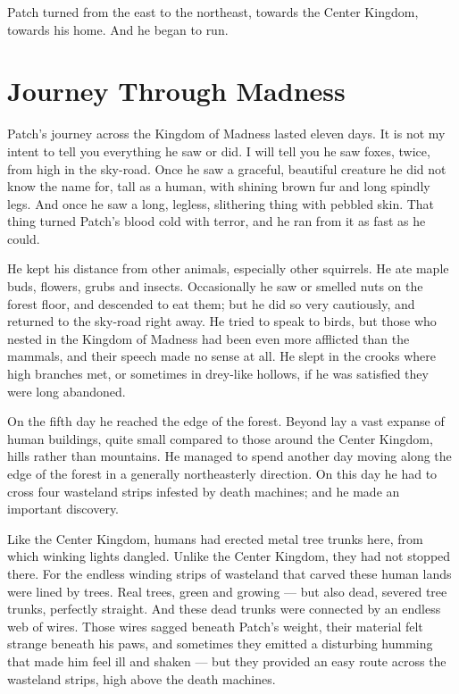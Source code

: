 \documentclass[ebook,oneside,openany,17pt]{memoir}
\newenvironment{tolerant}[1]{%
  \par\tolerance=#1\relax
}{%
  \par
}
\renewcommand{\thechapter}{\Roman{chapter}}
\newcounter{sections}
\newcommand{\sections}[1]{%
  \section*{#1}
  \addtocounter{sections}{1}%
  \pdfbookmark[1]{#1}{section.\thechapter.\thesections}}
\begin{document}
Patch turned from the east to the northeast, towards the Center
Kingdom, towards his home. And he began to run.


\sections{Journey Through Madness}

\begin{tolerant}{500}
Patch’s journey across the Kingdom of Madness last\-ed eleven days. It
is not my intent to tell you everything he saw or did. I will tell you
he saw foxes, twice, from high in the sky-road. Once he saw a
graceful, beautiful creature he did not know the name for, tall as a
human, with shining brown fur and long spindly legs. And once he saw a
long, legless, slithering thing with pebbled skin. That thing turned
Patch’s blood cold with terror, and he ran from it as fast as he
could.
\end{tolerant}

He kept his distance from other animals, especially other
squirrels. He ate maple buds, flowers, grubs and insects. Occasionally
he saw or smelled nuts on the forest floor, and descended to eat them;
but he did so very cautiously, and returned to the sky-road right
away. He tried to speak to birds, but those who nested in the Kingdom
of Madness had been even more afflicted than the mammals, and their
speech made no sense at all. He slept in the crooks where high
branches met, or sometimes in drey-like hollows, if he was satisfied
they were long abandoned.

On the fifth day he reached the edge of the forest. Beyond lay a vast
expanse of human buildings, quite small compared to those around the
Center Kingdom, hills rather than mountains. He managed to spend
another day moving along the edge of the forest in a generally
northeasterly direction. On this day he had to cross four wasteland
strips infested by death machines; and he made an important discovery.

\begin{tolerant}{1000}
Like the Center Kingdom, humans had erected metal tree trunks here,
from which winking lights dangled. Unlike the Center Kingdom, they had
not stopped there. For the endless winding strips of wasteland that
carved these human lands were lined by trees. Real trees, green and
growing — but also dead, severed tree trunks, perfectly straight. And
these dead trunks were connected by an endless web of wires. Those
wires sagged beneath Patch’s weight, their material felt strange
beneath his paws, and sometimes they emitted a disturbing humming that
made him feel ill and shaken — but they provided an easy route across
the wasteland strips, high above the death machines.
\end{tolerant}
\end{document}
